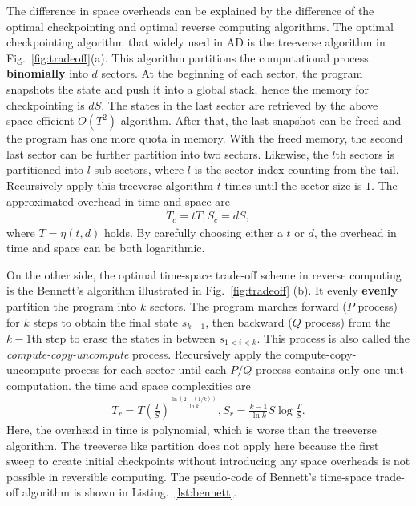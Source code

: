 \documentclass{article}
\newcommand{\<}{\langle}
\renewcommand{\>}{\rangle}
\newcommand{\Fig}[1]{Fig.~\ref{#1}}
\newcommand{\Lst}[1]{Listing.~\ref{#1}}
\theoremstyle{definition}\newtheorem{definition}{\textit{Definition}}
\begin{document}
The difference in space overheads can be explained by the difference of the optimal checkpointing and optimal reverse computing algorithms.
The optimal checkpointing algorithm that widely used in AD is the treeverse algorithm in \Fig{fig:tradeoff}(a).
This algorithm partitions the computational process \textbf{binomially} into $d$ sectors. At the beginning of each sector, the program snapshots the state and push it into a global stack, hence the memory for checkpointing is $dS$.
The states in the last sector are retrieved by the above space-efficient $O(T^2)$ algorithm. After that, the last snapshot can be freed and the program has one more quota in memory. With the freed memory, the second last sector can be further partition into two sectors.
Likewise, the $l$th sectors is partitioned into $l$ sub-sectors, where $l$ is the sector index counting from the tail.
Recursively apply this treeverse algorithm $t$ times until the sector size is $1$. The approximated overhead in time and space are
\begin{align}
    T_c = tT, S_c = dS,
\end{align}
where $T = \eta(t, d)$ holds. By carefully choosing either a $t$ or $d$, the overhead in time and space can be both logarithmic.

On the other side, the optimal time-space trade-off scheme in reverse computing is the Bennett's algorithm illustrated in \Fig{fig:tradeoff} (b). It evenly \textbf{evenly} partition the program into $k$ sectors. The program marches forward ($P$ process) for $k$ steps to obtain the final state $s_{k+1}$, then backward ($Q$ process) from the $k-1$th step to erase the states in between $s_{1<i<k}$. This process is also called the \textit{compute-copy-uncompute} process. Recursively apply the compute-copy-uncompute process for each sector until each $P/Q$ process contains only one unit computation. the time and space complexities are
\begin{align}\label{eq:rev}
    T_r = T\left(\frac{T}{S}\right)^{\frac{\ln(2-(1/k))}{\ln k}}, S_r = \frac{k-1}{\ln k}S\log\frac{T}{S}.
\end{align}
Here, the overhead in time is polynomial, which is worse than the treeverse algorithm. The treeverse like partition does not apply here because the first sweep to create initial checkpoints without introducing any space overheads is not possible in reversible computing. The pseudo-code of Bennett's time-space trade-off algorithm is shown in \Lst{lst:bennett}.
\end{document}
